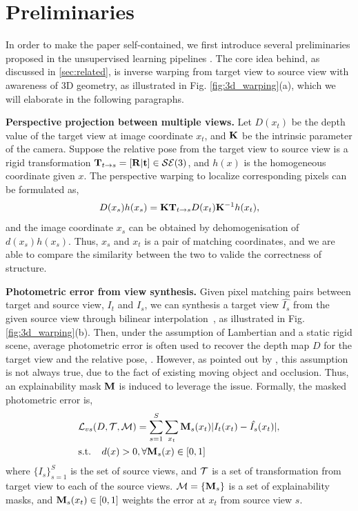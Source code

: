 \vspace{-0.7\baselineskip}
\section{Preliminaries}
\label{sec:preliminaries}
\vspace{-0.3\baselineskip}

In order to make the paper self-contained, we first introduce several preliminaries proposed in the unsupervised learning pipelines \cite{zhou2017unsupervised,godard2016unsupervised}. The core idea behind, as discussed in \ref{sec:related}, is inverse warping from target view to source view with awareness of 3D geometry, as illustrated in Fig. \ref{fig:3d_warping}(a), which we will elaborate in the following paragraphs.


\textbf{Perspective projection between multiple views.}
Let $D(x_t)$ be the depth value of the target view at image coordinate $x_t$, and ${\mathbf K}$ be the intrinsic parameter of the camera. Suppose the relative pose from the target view to source view is a rigid transformation ${\mathbf T}_{t\rightarrow s} = [{\mathbf R} | {\mathbf t}] \in {\mathcal S}{\mathcal E}(3)$, and $h(x)$ is the homogeneous coordinate given $x$. The perspective warping to localize corresponding pixels can be formulated as, 
\begin{align}
\label{eqn:warp}
D(x_s)h(x_s) = {\mathbf K}{\mathbf T}_{t\rightarrow s}D(x_t){\mathbf K}^{-1}h(x_t),
\end{align}
and the image coordinate $x_s$ can be obtained by dehomogenisation of $d(x_s)h(x_s)$. Thus, $x_s$ and $x_t$ is a pair of matching coordinates, and we are able to compare the similarity between the two to valide the correctness of structure.


\textbf{Photometric error from view synthesis.} 
\label{chap:warping}
Given pixel matching pairs between target and source view, \ie $I_t$ and $I_s$, we can synthesis a target view $\hat{I_s}$ from the given source view through bilinear interpolation~\cite{GargBR16}, as illustrated in Fig. \ref{fig:3d_warping}(b). 
Then, under the assumption of Lambertian and a static rigid scene, average photometric error is often used to recover the depth map $D$ for the target view and the relative pose, \eg \cite{zhou2017unsupervised}. 
However, as pointed out by \cite{zhou2017unsupervised}, this assumption is not always true, due to the fact of existing moving object and occlusion. Thus, an explainability mask ${\mathbf M}$ is induced to leverage the issue. Formally, the masked photometric error is,
\begin{align}
\label{eqn:photometric}
& {\mathcal L}_{vs}(D, {\mathcal T}, {\mathcal M}) = \sum_{s=1}^{S}\sum_{x_t}{\mathbf M}_s(x_t)|I_t(x_t) - \hat{I_s}(x_t)|, \nonumber \\
& \text{s.t. ~~} d(x) > 0, \forall {\mathbf M}_s(x)\in [0, 1]
\end{align}
where $\{I_s\}_{s=1}^{S}$ is the set of source views, and ${\mathcal T}$ is a set of transformation from target view to each of the source views. 
${\mathcal M} = \{{\mathbf M}_s\}$ is a set of explainability masks, and ${\mathbf M}_s(x_t) \in [0, 1]$ weights the error at $x_t$ from source view $s$.

